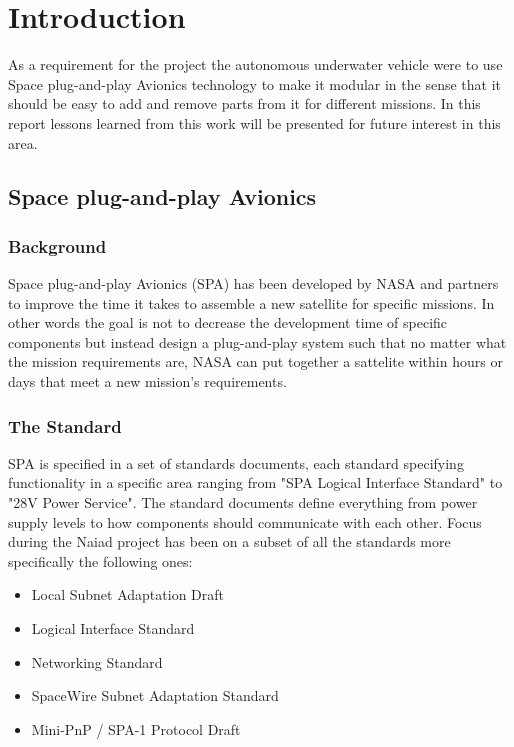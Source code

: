\section{Introduction}\label{sec:introduction}
As a requirement for the project the autonomous underwater vehicle were to use
Space plug-and-play Avionics technology to make it modular in the sense that
it should be easy to add and remove parts from it for different missions. In
this report lessons learned from this work will be presented for future
interest in this area.

\subsection{Space plug-and-play Avionics}
\subsubsection{Background}
Space plug-and-play Avionics (SPA) has been developed by NASA and partners to
improve the time it takes to assemble a new satellite for specific missions.
In other words the goal is not to decrease the development time of specific
components but instead design a plug-and-play system such that no matter what
the mission requirements are, NASA can put together a sattelite within hours or
days that meet a new mission's requirements.

\pagebreak
\subsubsection{The Standard}
SPA is specified in a set of standards documents, each standard specifying
functionality in a specific area ranging from "SPA Logical Interface Standard"
to "28V Power Service". The standard documents define everything from power
supply levels to how components should communicate with each other.
Focus during the Naiad project has
been on a subset of all the standards more specifically the following ones:

\begin{itemize}
  \item Local Subnet Adaptation Draft
  \item Logical Interface Standard \cite{spa:logical_interface}
  \item Networking Standard \cite{spa:networking}
  \item SpaceWire Subnet Adaptation Standard \cite{spa:spacewire}
  \item Mini-PnP / SPA-1 Protocol Draft
\end{itemize}

